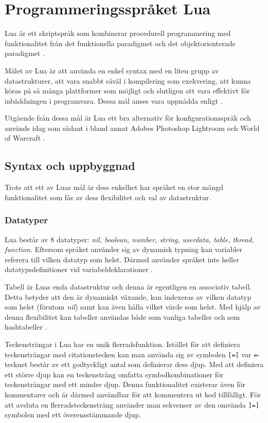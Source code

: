 
\section{Programmeringsspråket Lua}

Lua är ett skriptspråk som kombinerar procedurell programmering med
funktionalitet från det funktionella paradigmet och det objektorienterade
paradigmet \citep{luaimp}.

Målet av Lua är att använda en enkel syntax med en liten grupp av
datastrukturer, att vara snabbt såväl i kompilering som exekvering, att kunna
köras på så många plattformer som möjligt och slutligen att vara effektivt för
inbäddningen i programvara. Dessa mål anses vara uppnådda enligt \cite{luaimp}.

Utgående från dessa mål är Lua ett bra alternativ för konfigurationsspråk och
används idag som sådant i bland annat Adobes Photoshop Lightroom och World of
Warcraft \citep{lua}.

\subsection{Syntax och uppbyggnad}

Trots att ett av Luas mål är dess enkelhet har språket en stor mängd
funktionalitet som fås av dess flexibilitet och val av datastruktur.

\subsubsection{Datatyper}

Lua består av 8 datatyper: \textit{nil, boolean, number, string, userdata,
 table, thread, function}. Eftersom språket använder sig av dynamisk typning
 kan variabler referera till vilken datatyp som helst. Därmed använder språket
 inte heller datatypsdefinitioner vid variabeldeklarationer \citep[s.
 9]{ir06}.

Tabell är Luas enda datastruktur och denna är egentligen en associativ
tabell. Detta betyder att den är dynamiskt växande, kan indexeras av vilken
datatyp som helst (förutom \textit{nil}) samt kan även hålla vilket värde som
helst. Med hjälp av denna flexibilitet kan tabeller användas både som
vanliga tabeller och som hashtabeller \citep[s. 15]{ir06}.

Teckensträngar i Lua har en unik flerradsfunktion. Istället för att definiera
teckensträngar med citationstecken kan man använda sig av symbolen \verb+[=[+
var \verb+=+-tecknet består av ett godtyckligt antal som definierar dess djup.
Med att definiera ett större djup kan en teckensträng omfatta
symbolkombinationer för teckensträngar med ett mindre djup. Denna
funktionalitet existerar även för kommentarer och är därmed användbar för att
kommentera ut kod tillfälligt. För att avsluta en flerradsteckensträng
använder man sekvenser av den omvända \verb+]=]+ symbolen med ett
överensstämmande djup.

